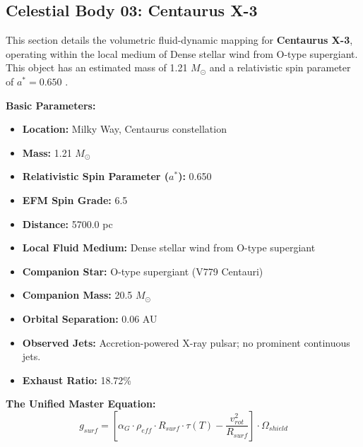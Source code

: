 \documentclass[11pt, a4paper]{article}
\begin{document}
\clearpage
\subsection{Celestial Body 03: Centaurus X-3}
This section details the volumetric fluid-dynamic mapping for \textbf{Centaurus X-3}, operating within the local medium of Dense stellar wind from O-type supergiant. This object has an estimated mass of 1.21 $M_{\odot}$ and a relativistic spin parameter of $a^* = 0.650$ \cite{rawls2011, simbad}.

\vspace{0.5em}
\noindent \textbf{Basic Parameters:}
\begin{itemize}
  \item \textbf{Location:} Milky Way, Centaurus constellation
  \item \textbf{Mass:} 1.21 $M_{\odot}$
  \item \textbf{Relativistic Spin Parameter ($a^*$):} 0.650
  \item \textbf{EFM Spin Grade:} 6.5
  \item \textbf{Distance:} 5700.0 pc
  \item \textbf{Local Fluid Medium:} Dense stellar wind from O-type supergiant
  \item \textbf{Companion Star:} O-type supergiant (V779 Centauri)
  \item \textbf{Companion Mass:} 20.5 $M_{\odot}$
  \item \textbf{Orbital Separation:} 0.06 AU
  \item \textbf{Observed Jets:} Accretion-powered X-ray pulsar; no prominent continuous jets.
  \item \textbf{Exhaust Ratio:} 18.72\%
\end{itemize}

\vspace{0.5em}
\noindent \textbf{The Unified Master Equation:}
$$ g_{surf} = \left[ \alpha_G \cdot \rho_{eff} \cdot R_{surf} \cdot \tau(T) - \frac{v_{rot}^2}{R_{surf}} \right] \cdot \Omega_{shield} $$
\end{document}
